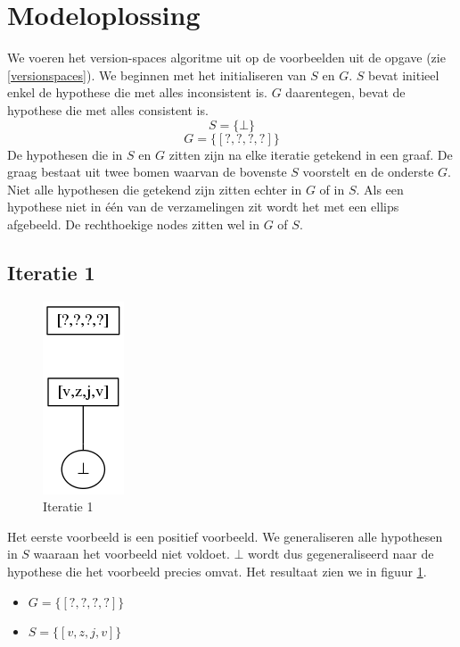 \documentclass[alternative-exam.tex]{subfiles}
\begin{document}
\section{Modeloplossing}
We voeren het version-spaces algoritme uit op de voorbeelden uit de opgave (zie \ref{versionspaces}). We beginnen met het initialiseren van $S$ en $G$. $S$ bevat initieel enkel de hypothese die met alles inconsistent is. $G$ daarentegen, bevat de hypothese die met alles consistent is.
\[
S = \{\bot\}
\]
\[
G = \{[?,?,?,?]\}
\]
De hypothesen die in $S$ en $G$ zitten zijn na elke iteratie getekend in een graaf. De graag bestaat uit twee bomen waarvan de bovenste $S$ voorstelt en de onderste $G$. Niet alle hypothesen die getekend zijn zitten echter in $G$ of in $S$. Als een hypothese niet in \'e\'en van de verzamelingen zit wordt het met een ellips afgebeeld. De rechthoekige nodes zitten wel in $G$ of $S$.
\subsection{Iteratie 1}
\begin{figure}
[H]
\centering
\caption{Iteratie 1}
\label{iter_1}
\includegraphics[scale=0.5]{resources/graphs/iteration_1.png}
\end{figure}
Het eerste voorbeeld is een positief voorbeeld. We generaliseren alle hypothesen in $S$ waaraan het voorbeeld niet voldoet. $\bot$ wordt dus gegeneraliseerd naar de hypothese die het voorbeeld precies omvat. Het resultaat zien we in figuur \ref{iter_1}.
\begin{itemize}
\item $G = \{[?,?,?,?]\}$
\item $S = \{[v,z,j,v]\}$
\end{itemize}
\end{document}

